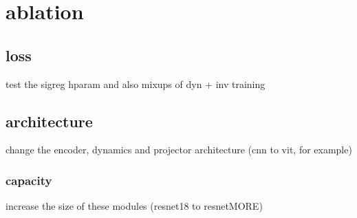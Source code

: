 \section{ablation}

\subsection{loss}

test the sigreg hparam \lambda and also mixups of dyn + inv training

\subsection{architecture}

change the encoder, dynamics and projector architecture (cnn to vit, for example)

\subsubsection{capacity}

increase the size of these modules (resnet18 to resnetMORE)
